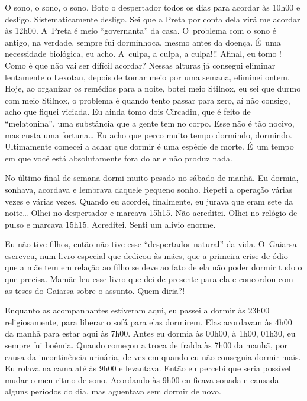 O sono, o sono, o sono. Boto o despertador todos os dias para acordar às
10h00 e desligo. Sistematicamente desligo. Sei que a Preta por conta
dela virá me acordar às 12h00. A~Preta é meio ``governanta'' da casa. O~problema com o sono é antigo, na verdade, sempre fui dorminhoca, mesmo
antes da doença. É~uma necessidade biológica, eu acho. A~culpa, a culpa,
a culpa!!! Afinal, eu tomo     ! Como é
que não vai ser difícil acordar? Nessas alturas já consegui eliminar
lentamente o Lexotan, depois de tomar meio por uma semana, eliminei
ontem. Hoje, ao organizar os remédios para a noite, botei meio Stilnox,
eu sei que durmo com meio Stilnox, o problema é quando tento passar para
zero, aí não consigo, acho que fiquei viciada. Eu ainda tomo dois
Circadin, que é feito de ``melatonina'', uma substância que a gente tem
no corpo. Esse não é tão nocivo, mas custa uma fortuna… Eu acho
que perco muito tempo dormindo, dormindo. Ultimamente comecei a achar
que dormir é uma espécie de morte. É~um tempo em que você está
absolutamente fora do ar e não produz nada.

No último final de semana dormi muito pesado no sábado de manhã. Eu
dormia, sonhava, acordava e lembrava daquele pequeno sonho. Repeti a
operação várias vezes e várias vezes. Quando eu acordei, finalmente, eu
jurava que eram sete da noite… Olhei no despertador e marcava
15h15. Não acreditei. Olhei no relógio de pulso e marcava 15h15.
Acreditei. Senti um alívio enorme.

Eu não tive filhos, então não tive esse ``despertador natural'' da vida.
O~Gaiarsa escreveu, num livro especial que dedicou às mães, que a
primeira crise de ódio que a mãe tem em relação ao filho se deve ao fato
de ela não poder dormir tudo o que precisa. Mamãe leu esse livro que dei
de presente para ela e concordou com as teses do Gaiarsa sobre o
assunto. Quem diria?!

Enquanto as acompanhantes estiveram aqui, eu passei a dormir às 23h00
religiosamente, para liberar o sofá para elas dormirem. Elas acordavam
às 4h00 da manhã para estar aqui às 7h00. Antes eu dormia às 00h00, à
1h00, 01h30, eu sempre fui boêmia. Quando começou a troca de fralda às
7h00 da manhã, por causa da incontinência urinária, de vez em quando eu
não conseguia dormir mais. Eu rolava na cama até às 9h00 e levantava.
Então eu percebi que seria possível mudar o meu ritmo de sono. Acordando
às 9h00 eu ficava sonada e cansada alguns períodos do dia, mas aguentava
sem dormir de novo.

